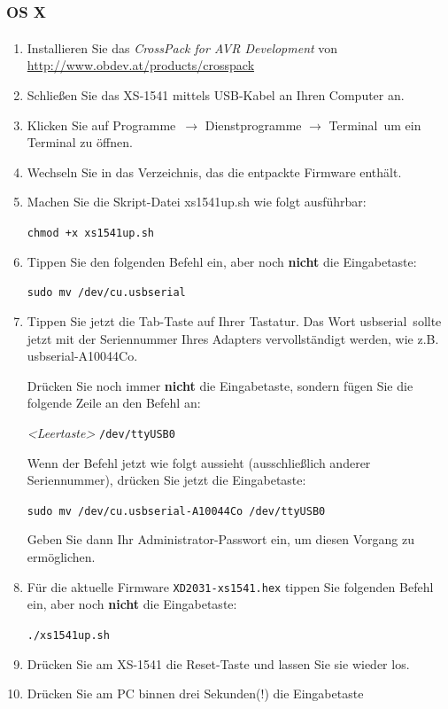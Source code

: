 \documentclass[10pt,a4paper]{scrartcl}		%
\begin{document}
\subsubsection*{OS X}
\begin{enumerate}
\item Installieren Sie das \textit{CrossPack for 
AVR\textsuperscript{\textregistered} Development} von 
\\\url{http://www.obdev.at/products/crosspack}
\item Schließen Sie das XS-1541 mittels USB-Kabel an Ihren Computer an.
\item Klicken Sie auf \glqq Programme\grqq\ $\to$ \glqq Dienstprogramme\grqq
$\to$ \glqq Terminal\grqq\ um ein Terminal zu öffnen.
\item Wechseln Sie in das Verzeichnis, das die entpackte Firmware enthält.
\item Machen Sie die Skript-Datei xs1541up.sh wie folgt ausführbar:

\texttt{chmod +x xs1541up.sh}
\item Tippen Sie den folgenden Befehl ein, aber noch \textbf{nicht} die
Eingabetaste:

\texttt{sudo mv /dev/cu.usbserial}

\item Tippen Sie jetzt die Tab-Taste auf Ihrer Tastatur. Das Wort
\glqq usbserial\grqq\ sollte jetzt mit der Seriennummer Ihres Adapters
vervollständigt werden, wie z.B. usbserial-A10044Co.

Drücken Sie noch immer \textbf{nicht} die Eingabetaste, sondern fügen
Sie die folgende Zeile an den Befehl an:

\textit{<Leertaste>} \texttt{/dev/ttyUSB0}

Wenn der Befehl jetzt wie folgt aussieht (ausschließlich anderer
Seriennummer), drücken Sie jetzt die Eingabetaste:

\texttt{sudo mv /dev/cu.usbserial-A10044Co /dev/ttyUSB0}

Geben Sie dann Ihr Administrator-Passwort ein, um diesen Vorgang
zu ermöglichen.
\item Für die aktuelle Firmware 
   \texttt{XD2031-xs1541.hex} tippen Sie
	folgenden Befehl ein, aber noch \textbf{nicht} die
	Eingabetaste:

	\texttt{./xs1541up.sh}

\item Drücken Sie am XS-1541 die Reset-Taste und lassen Sie sie wieder los.
\item Drücken Sie am PC binnen drei Sekunden(!) die Eingabetaste
\end{enumerate}
\end{document}
